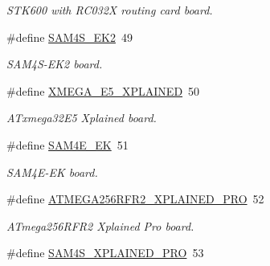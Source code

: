 \begin{DoxyCompactItemize}
\begin{DoxyCompactList}\small\item\em S\-T\-K600 with R\-C032\-X routing card board. \end{DoxyCompactList}\item 
\hypertarget{group__group__common__boards_ga588503ce59af4ecd9eb92c589ce36f57}{\#define \hyperlink{group__group__common__boards_ga588503ce59af4ecd9eb92c589ce36f57}{S\-A\-M4\-S\-\_\-\-E\-K2}~49}\label{group__group__common__boards_ga588503ce59af4ecd9eb92c589ce36f57}

\begin{DoxyCompactList}\small\item\em S\-A\-M4\-S-\/\-E\-K2 board. \end{DoxyCompactList}\item 
\hypertarget{group__group__common__boards_ga6f44c923ab25a96e4de1f389101fae63}{\#define \hyperlink{group__group__common__boards_ga6f44c923ab25a96e4de1f389101fae63}{X\-M\-E\-G\-A\-\_\-\-E5\-\_\-\-X\-P\-L\-A\-I\-N\-E\-D}~50}\label{group__group__common__boards_ga6f44c923ab25a96e4de1f389101fae63}

\begin{DoxyCompactList}\small\item\em A\-Txmega32\-E5 Xplained board. \end{DoxyCompactList}\item 
\hypertarget{group__group__common__boards_ga98d89841c87da3d8358691862e51d814}{\#define \hyperlink{group__group__common__boards_ga98d89841c87da3d8358691862e51d814}{S\-A\-M4\-E\-\_\-\-E\-K}~51}\label{group__group__common__boards_ga98d89841c87da3d8358691862e51d814}

\begin{DoxyCompactList}\small\item\em S\-A\-M4\-E-\/\-E\-K board. \end{DoxyCompactList}\item 
\hypertarget{group__group__common__boards_ga3e5ed6ddb1fa4224ecf5b36e7cd726aa}{\#define \hyperlink{group__group__common__boards_ga3e5ed6ddb1fa4224ecf5b36e7cd726aa}{A\-T\-M\-E\-G\-A256\-R\-F\-R2\-\_\-\-X\-P\-L\-A\-I\-N\-E\-D\-\_\-\-P\-R\-O}~52}\label{group__group__common__boards_ga3e5ed6ddb1fa4224ecf5b36e7cd726aa}

\begin{DoxyCompactList}\small\item\em A\-Tmega256\-R\-F\-R2 Xplained Pro board. \end{DoxyCompactList}\item 
\hypertarget{group__group__common__boards_ga31908f76cb4f5381f944dde3b97a5321}{\#define \hyperlink{group__group__common__boards_ga31908f76cb4f5381f944dde3b97a5321}{S\-A\-M4\-S\-\_\-\-X\-P\-L\-A\-I\-N\-E\-D\-\_\-\-P\-R\-O}~53}\label{group__group__common__boards_ga31908f76cb4f5381f944dde3b97a5321}


\end{DoxyCompactItemize}
